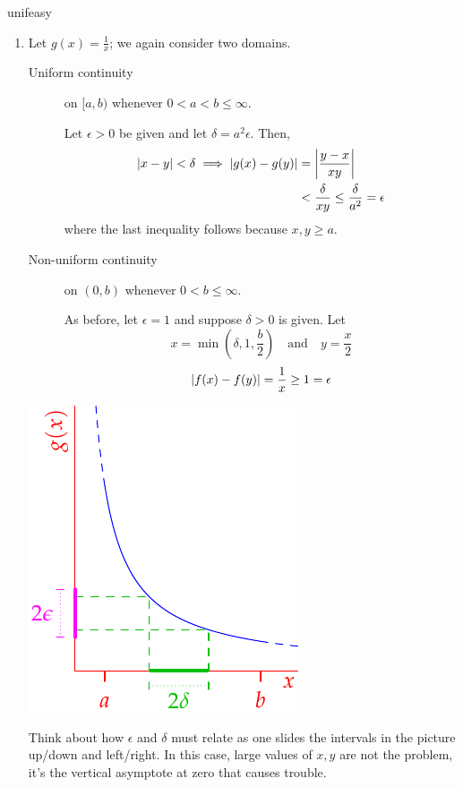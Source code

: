 \begin{examples}{}{unifeasy}
\begin{enumerate}
		\item\label{ex:1overxnotunif} Let $g(x)=\frac 1x$; we again consider two domains.\par
		\begin{minipage}[t]{0.65\linewidth}\vspace{-8pt}
			\begin{description}
				\item[Uniform continuity] on $[a,b)$ whenever $0<a<b\le \infty$.\par
				Let $\epsilon>0$ be given and let $\delta=a^2\epsilon$. Then,
				\begin{align*}
					\left| x-y\right|<\delta \implies \left| g(x)-g(y)\right|
					&=\left| \frac{y-x}{xy}\right|\\
					&<\frac\delta{xy}\le\frac{\delta}{a^2}
						=\epsilon
				\end{align*}
				where the last inequality follows because $x,y\ge a$.
				\item[Non-uniform continuity] on $(0,b)$ whenever $0<b\le\infty$.\par
				As before, let $\epsilon=1$ and suppose $\delta>0$ is given. 
				Let
				\[
					x=\min\left(\delta,1,\frac b2\right) 
					\quad\text{and}\quad 
					y=\frac x2
				\]
				\[
					\left| f(x)-f(y)\right|=\frac 1x\ge 1=\epsilon
				\]
			\end{description}
		\end{minipage}
		\hfill
		\begin{minipage}[t]{0.34\linewidth}\vspace{0pt}
			\flushright\includegraphics[scale=0.95]{unifcont2}
		\end{minipage}\bigbreak
		Think about how $\epsilon$ and $\delta$ must relate as one slides the intervals in the picture up/down and left/right. In this case, large values of $x,y$ are not the problem, it's the vertical asymptote at zero that causes trouble. 
		
	\end{enumerate}
\end{examples}


